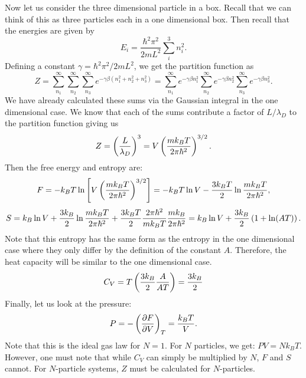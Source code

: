     Now let us consider the three dimensional particle in a box. Recall that we can think of this as three particles each in a one dimensional box. Then recall that the energies are given by
    \begin{equation}
        E_i = \frac{\hbar^2\pi^2}{2mL^2}\sum_i^3n_i^2.
    \end{equation}
    Defining a constant $\gamma=\hbar^2\pi^2/2mL^2$, we get the partition function as
    \begin{equation}
        Z = \sum_{n_1}^\infty\sum_{n_2}^\infty\sum_{n_3}^\infty e^{-\gamma\beta(n_1^2+n_2^2+n_3^2)} = \sum_{n_1}^\infty e^{-\gamma\beta n_1^2}\sum_{n_2}^\infty e^{-\gamma\beta n_2^2}\sum_{n_3}^\infty e^{-\gamma\beta n_3^2}.
    \end{equation}
    We have already calculated these sums via the Gaussian integral in the one dimensional case. We know that each of the sums contribute a factor of $L/\lambda_D$ to the partition function giving us
    \begin{equation}
        Z = \left( \frac{L}{\lambda_D} \right)^3 = V\left( \frac{mk_BT}{2\pi \hbar^2} \right)^{3/2}.
    \end{equation}
    Then the free energy and entropy are:
    \begin{equation}
        F = -k_BT\ln\left[ V\left( \frac{mk_BT}{2\pi\hbar^2} \right)^{3/2} \right]=-k_BT\ln V-\frac{3k_BT}{2}\ln\frac{mk_BT}{2\pi\hbar^2},
    \end{equation}
    \begin{equation}
        S =  k_B\ln V + \frac{3k_B}{2}\ln\frac{mk_BT}{2\pi\hbar^2}+\frac{3k_BT}{2}\frac{2\pi\hbar^2}{mk_BT}\frac{mk_B}{2\pi\hbar^2} = k_B\ln V + \frac{3k_B}{2}\left( 1+\ln(AT) \right).
    \end{equation}
    Note that this entropy has the same form as the entropy in the one dimensional case where they only differ by the definition of the constant $A$. Therefore, the heat capacity will be similar to the one dimensional case.
    \begin{equation}
        C_V = T\left( \frac{3k_B}{2}\frac{A}{AT} \right) = \frac{3k_B}{2}
    \end{equation}
    Finally, let us look at the pressure: 
    \begin{equation}
        P = -\left( \frac{\partial F}{\partial V} \right)_T = \frac{k_BT}{V}.
    \end{equation}
    Note that this is the ideal gas law for $N=1$. For $N$ particles, we get: $PV=Nk_BT$. However, one must note that while $C_V$ can simply be multiplied by $N$, $F$ and $S$ cannot. For $N$-particle systems, $Z$ must be calculated for $N$-particles.
\newpage
